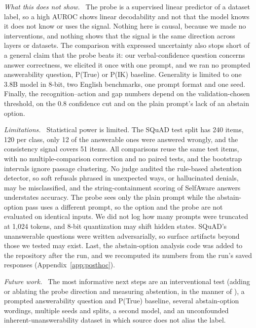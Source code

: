 \documentclass[10pt]{article}
\renewcommand{\paragraph}[1]{\par\vspace{0.3em}\noindent\textit{#1}\ }
\begin{document}
\paragraph{What this does not show.}
The probe is a supervised linear predictor of a dataset label, so a high AUROC shows linear decodability and not that the model knows it does not know or uses the signal. Nothing here is causal, because we made no interventions, and nothing shows that the signal is the same direction across layers or datasets. The comparison with expressed uncertainty also stops short of a general claim that the probe beats it: our verbal-confidence question concerns answer correctness, we elicited it once with one prompt, and we ran no prompted answerability question, P(True) or P(IK) baseline. Generality is limited to one 3.8B model in 8-bit, two English benchmarks, one prompt format and one seed. Finally, the recognition--action and gap numbers depend on the validation-chosen threshold, on the 0.8 confidence cut and on the plain prompt's lack of an abstain option.

\paragraph{Limitations.}
Statistical power is limited. The SQuAD test split has 240 items, 120 per class, only 12 of the answerable ones were answered wrongly, and the consistency signal covers 51 items. All comparisons reuse the same test items, with no multiple-comparison correction and no paired tests, and the bootstrap intervals ignore passage clustering. No judge audited the rule-based abstention detector, so soft refusals phrased in unexpected ways, or hallucinated denials, may be misclassified, and the string-containment scoring of SelfAware answers understates accuracy. The probe sees only the plain prompt while the abstain-option pass uses a different prompt, so the option and the probe are not evaluated on identical inputs. We did not log how many prompts were truncated at 1,024 tokens, and 8-bit quantization may shift hidden states. SQuAD's unanswerable questions were written adversarially, so surface artifacts beyond those we tested may exist. Last, the abstain-option analysis code was added to the repository after the run, and we recomputed its numbers from the run's saved responses (Appendix~\ref{app:posthoc}).

\paragraph{Future work.}
The most informative next steps are an interventional test (adding or ablating the probe direction and measuring abstention, in the manner of \citet{lavi2026directions}), a prompted answerability question and P(True) baseline, several abstain-option wordings, multiple seeds and splits, a second model, and an unconfounded inherent-unanswerability dataset in which source does not alias the label.
\end{document}
